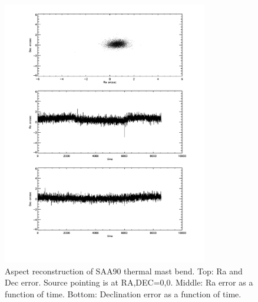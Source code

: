 \begin{figure}[tb]
\begin{center}
\includegraphics[width=0.8\textwidth]{images/saa90.pdf}
\caption{Aspect reconstruction of SAA90 thermal mast bend. Top: Ra and Dec error. Source pointing is at RA,DEC=0,0. Middle: Ra error as a function of time. Bottom: Declination error as a function of time. }
\label{saa90nusim}
\end{center}
\end{figure}

